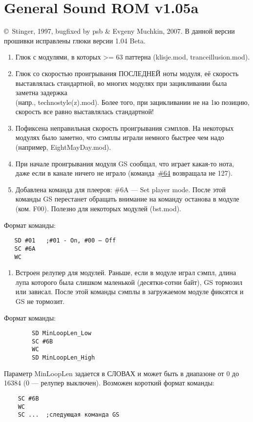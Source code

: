 \documentclass[a4paper,11pt]{article}
\begin{document}
\section{General Sound ROM v1.05a}
\copyright~Stinger, 1997,
bugfixed by psb \& Evgeny Muchkin, 2007.
В данной версии прошивки исправлены глюки версии 1.04 Beta.
\begin{enumerate}
\item Глюк с модулями, в которых >= 63 паттерна (klisje.mod, tranceillusion.mod).
\item Глюк со скоростью проигрывания ПОСЛЕДНЕЙ ноты модуля, её скорость выставлялась стандартной,
во многих модулях при зацикливании была заметна задержка\\
(напр., technostyle(z).mod).
Более того, при зацикливании не на 1ю позицию, скорость все равно выставлялась стандартной!
\item Пофиксена неправильная скорость проигрывания сэмплов. На некоторых модулях было заметно,
что сэмплы играли немного быстрее чем надо (например, EightMayDay.mod).
\item При начале проигрывания модуля GS сообщал, что играет какая-то нота, даже если в канале ничего не играло
(команда~\hyperref[cmd:64]{\#64} возвращала не 127).
\item Добавлена команда для плееров: \#6A --- Set player mode.
После этой команды GS перестанет обращать внимание на команду останова в модуле (ком. F00).
Полезно для некоторых модулей (bst.mod).\label{cmd:6A}
\end{enumerate}

Формат команды:
\begin{verbatim}
   SD #01	;#01 - On, #00 — Off
   SC #6A
   WC                              
\end{verbatim}
\begin{enumerate}[resume]
\item Встроен релупер для модулей. Раньше, если в модуле играл сэмпл,
длина лупа которого была слишком маленькой (десятки-сотни байт), GS тормозил или зависал.
После этой команды сэмплы в загружаемом модуле фиксятся и GS не тормозит.\label{cmd:6B}
\end{enumerate}

Формат команды:
\begin{verbatim}
	    SD MinLoopLen_Low
	    SC #6B
	    WC
	    SD MinLoopLen_High
\end{verbatim}

	Параметр MinLoopLen задается в СЛОВАХ и может быть в диапазоне от 0 до 16384
(0 --- релупер выключен).
	Возможен короткий формат команды:
\begin{verbatim}
    SC #6B
    WC
    SC ...	;следующая команда GS
\end{verbatim}
\end{document}
